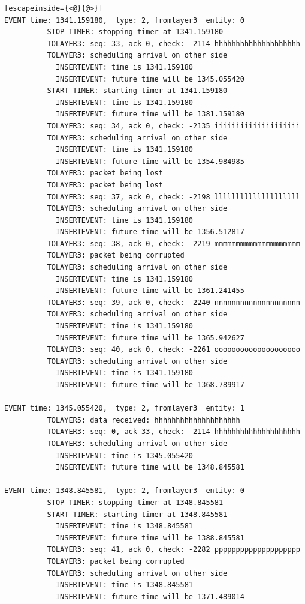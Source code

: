 \documentclass[paper=a4, fontsize=11pt]{scrartcl}
\numberwithin{equation}{section}		%
\numberwithin{figure}{section}			%
\numberwithin{table}{section}				%
\begin{document}
\begin{lstlisting}[escapeinside={<@}{@>}]
EVENT time: 1341.159180,  type: 2, fromlayer3  entity: 0
          STOP TIMER: stopping timer at 1341.159180
          TOLAYER3: seq: 33, ack 0, check: -2114 hhhhhhhhhhhhhhhhhhhh
          TOLAYER3: scheduling arrival on other side
            INSERTEVENT: time is 1341.159180
            INSERTEVENT: future time will be 1345.055420
          START TIMER: starting timer at 1341.159180
            INSERTEVENT: time is 1341.159180
            INSERTEVENT: future time will be 1381.159180
          TOLAYER3: seq: 34, ack 0, check: -2135 iiiiiiiiiiiiiiiiiiii
          TOLAYER3: scheduling arrival on other side
            INSERTEVENT: time is 1341.159180
            INSERTEVENT: future time will be 1354.984985
          TOLAYER3: packet being lost
          TOLAYER3: packet being lost
          TOLAYER3: seq: 37, ack 0, check: -2198 llllllllllllllllllll
          TOLAYER3: scheduling arrival on other side
            INSERTEVENT: time is 1341.159180
            INSERTEVENT: future time will be 1356.512817
          TOLAYER3: seq: 38, ack 0, check: -2219 mmmmmmmmmmmmmmmmmmmm
          TOLAYER3: packet being corrupted
          TOLAYER3: scheduling arrival on other side
            INSERTEVENT: time is 1341.159180
            INSERTEVENT: future time will be 1361.241455
          TOLAYER3: seq: 39, ack 0, check: -2240 nnnnnnnnnnnnnnnnnnnn
          TOLAYER3: scheduling arrival on other side
            INSERTEVENT: time is 1341.159180
            INSERTEVENT: future time will be 1365.942627
          TOLAYER3: seq: 40, ack 0, check: -2261 oooooooooooooooooooo
          TOLAYER3: scheduling arrival on other side
            INSERTEVENT: time is 1341.159180
            INSERTEVENT: future time will be 1368.789917

EVENT time: 1345.055420,  type: 2, fromlayer3  entity: 1
          TOLAYER5: data received: hhhhhhhhhhhhhhhhhhhh
          TOLAYER3: seq: 0, ack 33, check: -2114 hhhhhhhhhhhhhhhhhhhh
          TOLAYER3: scheduling arrival on other side
            INSERTEVENT: time is 1345.055420
            INSERTEVENT: future time will be 1348.845581

EVENT time: 1348.845581,  type: 2, fromlayer3  entity: 0
          STOP TIMER: stopping timer at 1348.845581
          START TIMER: starting timer at 1348.845581
            INSERTEVENT: time is 1348.845581
            INSERTEVENT: future time will be 1388.845581
          TOLAYER3: seq: 41, ack 0, check: -2282 pppppppppppppppppppp
          TOLAYER3: packet being corrupted
          TOLAYER3: scheduling arrival on other side
            INSERTEVENT: time is 1348.845581
            INSERTEVENT: future time will be 1371.489014


\end{lstlisting}
\end{document}
